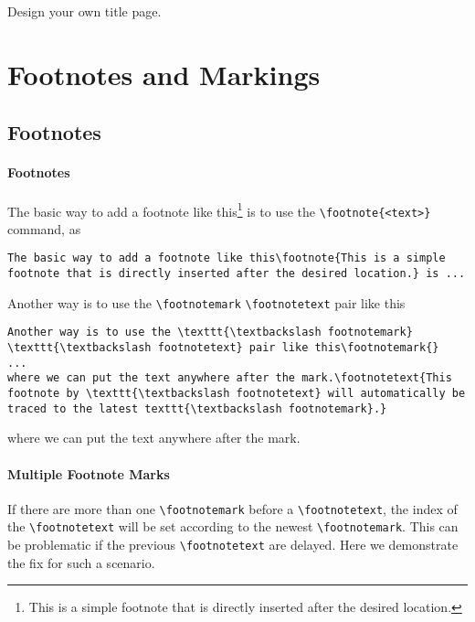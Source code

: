 \begin{exercisebox}
\begin{Exercise}
Design your own title page.
\end{Exercise}
\end{exercisebox}

\section{Footnotes and Markings}

\subsection{Footnotes}

\paragraph{Footnotes}
The basic way to add a footnote like this\footnote{This is a simple footnote that is directly inserted after the desired location.} is to use the \texttt{\textbackslash footnote\allowbreak\{<text>\}} command, as
\begin{lstlisting}
The basic way to add a footnote like this\footnote{This is a simple footnote that is directly inserted after the desired location.} is ...   
\end{lstlisting}
Another way is to use the \texttt{\textbackslash footnotemark} \texttt{\textbackslash footnotetext} pair like this\footnotemark{}
\begin{lstlisting}
Another way is to use the \texttt{\textbackslash footnotemark} \texttt{\textbackslash footnotetext} pair like this\footnotemark{}
...
where we can put the text anywhere after the mark.\footnotetext{This footnote by \texttt{\textbackslash footnotetext} will automatically be traced to the latest texttt{\textbackslash footnotemark}.}
\end{lstlisting}
where we can put the text anywhere after the mark.

\paragraph{Multiple Footnote Marks}
If there are more than one \texttt{\textbackslash footnotemark} before a \texttt{\textbackslash footnotetext}, the index of the \texttt{\textbackslash footnotetext} will be set according to the newest \texttt{\textbackslash footnotemark}. This can be problematic if the previous \texttt{\textbackslash footnotetext} are delayed. Here we demonstrate the fix\footnotemark{} for such a scenario\footnotemark{}.

